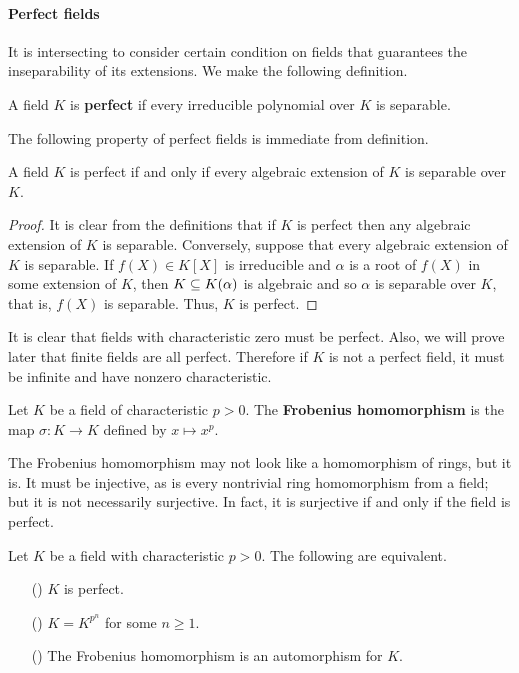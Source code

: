 \paragraph{Perfect fields}
It is intersecting to consider certain condition on fields that guarantees the inseparability of its extensions. We make the following definition.
\begin{definition}
A field $K$ is \textbf{perfect} if every irreducible polynomial over $K$ is separable.
\end{definition}
The following property of perfect fields is immediate from definition.
\begin{proposition}\label{field perfect iff algebraic ext is separable}
A field $K$ is perfect if and only if every algebraic extension of $K$ is separable over $K$.
\end{proposition}
\begin{proof}
It is clear from the definitions that if $K$ is perfect then any algebraic extension of $K$ is separable. Conversely, suppose that every algebraic extension of $K$ is separable. If $f(X)\in K[X]$ is irreducible and $\alpha$ is a root of $f(X)$ in some extension of $K$, then $K\subseteq K(\alpha)$ is algebraic and so $\alpha$ is separable over $K$, that is, $f(X)$ is separable. Thus, $K$ is perfect.
\end{proof}
It is clear that fields with characteristic zero must be perfect. Also, we will prove later that finite fields are all perfect. Therefore if $K$ is not a perfect field, it must be infinite and have nonzero characteristic.
\begin{definition}
Let $K$ be a field of characteristic $p>0$. The \textbf{Frobenius homomorphism} is the map $\sigma:K\to K$ defined by $x\mapsto x^p$.
\end{definition}
The Frobenius homomorphism may not look like a homomorphism of rings, but
it is. It must be injective, as is every nontrivial ring homomorphism
from a field; but it is not necessarily surjective. In fact, it is surjective if and only if the field is perfect.
\begin{proposition}\label{field perfect iff Frobenius}
Let $K$ be a field with characteristic $p>0$. The following are equivalent.
\begin{itemize}
\item[(\rmnum{1})] $K$ is perfect.
\item[(\rmnum{2})] $K=K^{p^n}$ for some $n\geq 1$. 
\item[(\rmnum{3})] The Frobenius homomorphism is an automorphism for $K$.
\end{itemize}
\end{proposition}
